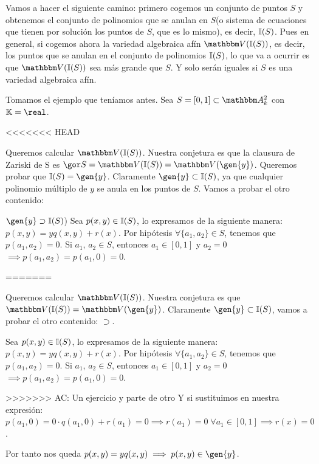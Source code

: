 Vamos a hacer el siguiente camino: primero cogemos un conjunto de puntos $S$ y obtenemos el conjunto de polinomios que se anulan en $S$(o sistema de ecuaciones que tienen por solución los puntos de $S$, que es lo mismo), es decir, $\mathbb{I}(S)$. Pues en general, si cogemos ahora la variedad algebraica afín $\V(\I(S))$, es decir, los puntos que se anulan en el conjunto de polinomios $\mathbb{I}(S)$, lo que va a ocurrir es que $\V(\I(S))$ sea más grande que $S$. Y solo serán iguales si $S$ es una variedad algebraica afín.


\begin{example}
	Tomamos el ejemplo que teníamos antes. Sea $S=[0,1] \subset \A_k^2$ con $\K=\real$.

	\begin{figure}
		\centering
	\end{figure}
<<<<<<< HEAD

		Queremos calcular $\V(\I(S))$. Nuestra conjetura es que la clausura de Zariski de S es $\cls{S}=\V(\I(S))=\V(\gen{y})$. Queremos probar que $\I(S)=\gen{y}$. Claramente $\gen{y} \subset \I(S)$, ya que cualquier polinomio múltiplo de $y$ se anula en los puntos  de $S$. Vamos a probar el otro contenido:

		$\gen{y} \supset \I(S)$) Sea $p(x,y) \in \mathbb{I}(S)$, lo expresamos de la siguiente manera: $p(x,y)=yq(x,y)+r(x)$. Por hipótesis $\forall\{a_1,a_2\} \in S$, tenemos que $p(a_1,a_2)=0$. Si $a_1$, $a_2 \in S$, entonces $a_1 \in [0,1]$ y $a_2=0$ $\implies p(a_1,a_2)=p(a_1,0)=0$.

=======

		Queremos calcular $\V(\I(S))$. Nuestra conjetura es que $\V(\I(S))=\V(\gen{y})$. Claramente $\gen{y} \subset \I(S)$, vamos a probar el otro contenido: $\supset$.

		Sea $p(x,y) \in \mathbb{I}(S)$, lo expresamos de la siguiente manera: $p(x,y)=yq(x,y)+r(x)$. Por hipótesis $\forall\{a_1,a_2\} \in S$, tenemos que $p(a_1,a_2)=0$. Si $a_1$, $a_2 \in S$, entonces $a_1 \in [0,1]$ y $a_2=0$ $\implies p(a_1,a_2)=p(a_1,0)=0$.

>>>>>>> AC: Un ejercicio y parte de otro
		Y si sustituimos en nuestra expresión: $p(a_1,0)=0\cdot q(a_1,0)+r(a_1)=0 \implies r(a_1)=0 \; \forall a_1 \in [0,1] \implies r(x)=0$.

		Por tanto nos queda $p(x,y)=yq(x,y) \implies p(x,y) \in \gen{y}$.
\end{example}

